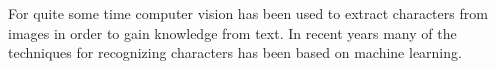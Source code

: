 
For quite some time computer vision has been used to extract characters from
images in order to gain knowledge from text. In recent years many of the
techniques for recognizing characters has been based on machine learning.

